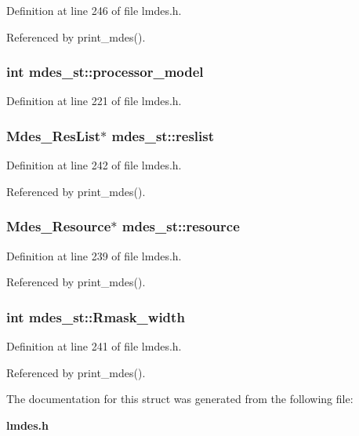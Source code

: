 Definition at line 246 of file lmdes.h.

Referenced by print\_\-mdes().
\subsubsection{\setlength{\rightskip}{0pt plus 5cm}int \bf{mdes\_\-st::processor\_\-model}}\label{structmdes__st_6b9ab0dc517ef1c37a6ffa34e417cb8f}




Definition at line 221 of file lmdes.h.
\subsubsection{\setlength{\rightskip}{0pt plus 5cm}\bf{Mdes\_\-Res\-List}$\ast$ \bf{mdes\_\-st::reslist}}\label{structmdes__st_4a7f6816b728d2a902e64d1f18a183e6}




Definition at line 242 of file lmdes.h.

Referenced by print\_\-mdes().
\subsubsection{\setlength{\rightskip}{0pt plus 5cm}\bf{Mdes\_\-Resource}$\ast$ \bf{mdes\_\-st::resource}}\label{structmdes__st_75ce60f24fe1161514001078b7098146}




Definition at line 239 of file lmdes.h.

Referenced by print\_\-mdes().
\subsubsection{\setlength{\rightskip}{0pt plus 5cm}int \bf{mdes\_\-st::Rmask\_\-width}}\label{structmdes__st_8828807b63450fd197027a97962c1213}




Definition at line 241 of file lmdes.h.

Referenced by print\_\-mdes().

The documentation for this struct was generated from the following file:\begin{CompactItemize}
\item 
\bf{lmdes.h}\end{CompactItemize}
